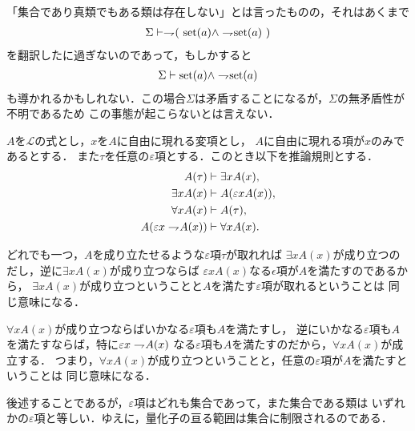 	「集合であり真類でもある類は存在しない」とは言ったものの，それはあくまで
	\begin{align}
		\Sigma \vdash \rightharpoondown\hspace{-0.25em} (\ \operatorname*{set} (a) \wedge \rightharpoondown\hspace{-0.25em} \operatorname*{set} (a)\ )
	\end{align}
	を翻訳したに過ぎないのであって，もしかすると
	\begin{align}
		\Sigma \vdash \operatorname*{set} (a) \wedge \rightharpoondown\hspace{-0.25em} \operatorname*{set} (a)
	\end{align}
	も導かれるかもしれない．この場合$\Sigma$は矛盾することになるが，$\Sigma$の無矛盾性が不明であるため
	この事態が起こらないとは言えない．
	
	\begin{screen}
		\begin{logicalaxm}[量化記号に関する規則]\label{logicalaxm:rules_of_quantifiers}
			$A$を$\mathcal{L}$の式とし，$x$を$A$に自由に現れる変項とし，
			$A$に自由に現れる項が$x$のみであるとする．
			また$\tau$を任意の$\varepsilon$項とする．このとき以下を推論規則とする．
			\begin{align}
				A(\tau) &\vdash \exists x A(x), \\
				\exists x A(x) &\vdash A(\varepsilon x A(x)), \\
				\forall x A(x) &\vdash A(\tau), \\
				A(\varepsilon x \rightharpoondown\hspace{-0.25em} A(x)) &\vdash \forall x A(x).
			\end{align}
		\end{logicalaxm}
	\end{screen}
	
	どれでも一つ，$A$を成り立たせるような$\varepsilon$項$\tau$が取れれば
	$\exists x A(x)$が成り立つのだし，逆に$\exists x A(x)$が成り立つならば
	$\varepsilon x A(x)$なる$\epsilon$項が$A$を満たすのであるから，
	$\exists x A(x)$が成り立つということと$A$を満たす$\varepsilon$項が取れるということは
	同じ意味になる．
	
	$\forall x A(x)$が成り立つならばいかなる$\varepsilon$項も$A$を満たすし，
	逆にいかなる$\varepsilon$項も$A$を満たすならば，特に$\varepsilon x \rightharpoondown\hspace{-0.25em} A(x)$
	なる$\varepsilon$項も$A$を満たすのだから，$\forall x A(x)$が成立する．
	つまり，$\forall x A(x)$が成り立つということと，任意の$\varepsilon$項が$A$を満たすということは
	同じ意味になる．
	
	後述することであるが，$\varepsilon$項はどれも集合であって，また集合である類は
	いずれかの$\varepsilon$項と等しい．ゆえに，量化子の亘る範囲は集合に制限されるのである．
	
